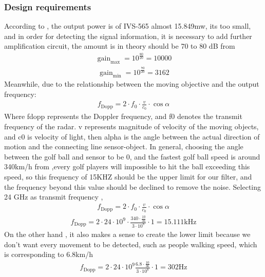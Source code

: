 \subsubsection{Design requirements}
According to \textcite{IVS-565}, the output power is of IVS-565 almost 15.849mw, its too small, and in order for detecting the signal information, it is necessary to add further amplification circuit, the amount is in theory should be 70 to 80 dB from \textcite{Application_Note_I}
\begin{align}
\operatorname{gain}_{\max }=10^{\frac{80}{20}}=10000    
\end{align}
\begin{align}
\operatorname{gain}_{\min}=10^{\frac{70}{20}}=3162    
\end{align}
Meanwhile, due to the relationship between the moving objective and the output frequency:
\begin{align}
f_{\text {Dopp}}=2\cdot f_{0}\cdot\frac{v}{c_{0}}\cdot\cos \alpha
\end{align}
Where fdopp represents the Doppler frequency, and  f0 denotes the transmit frequency of the radar. v represents magnitude of velocity of the moving objects, and c0 is velocity of light, then alpha is the angle between the actual direction of motion and the connecting line sensor-object.
In general, choosing the angle between the golf ball and sensor to be 0, and the fastest golf ball speed is around 340km/h from \textcite{kobayashi1988golf},every golf players will impossible to hit the ball exceeding this speed, so this frequency of 15KHZ should be the upper limit for our filter, and the frequency beyond this value should be declined to remove the noise. Selecting 24 GHz as transmit frequency \textcite{Application_Note_I},
\begin{align}
f_{\text {Dopp}}=2\cdot f_{0}\cdot\frac{v}{c_{0}}\cdot\cos \alpha_{ }
\end{align}
\begin{align}
f_{\text {Dopp}}=2\cdot24\cdot10^{9} \cdot\frac{340\cdot \frac{10}{36}}{3\cdot10^{8}}\cdot1=15.111 \mathrm{kHz}
\end{align}
 On the other hand , it also makes a sense to create the lower limit because we don’t want every movement to be detected, such as people walking speed, which is corresponding to 6.8km/h
 \begin{align}
f_{\text {Dopp}}=2\cdot24\cdot10^{9} \frac{6.8\cdot \frac{10}{36}}{3\cdot10^{8}}\cdot1=302 \mathrm{Hz}
\end{align}
